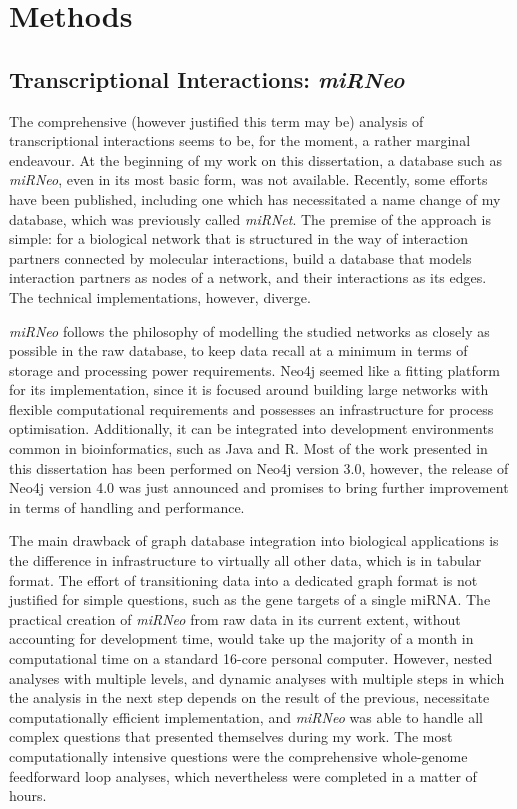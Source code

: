 \section{Methods} \label{sec:discussion:methods}

\subsection{Transcriptional Interactions: \emph{miRNeo}} \label{sec:discussion:mirneo}
The comprehensive (however justified this term may be) analysis of transcriptional interactions seems to be, for the moment, a rather marginal endeavour. At the beginning of my work on this dissertation, a database such as \emph{miRNeo}, even in its most basic form, was not available. Recently, some efforts have been published,\cite{Fan2016,Tokar2018} including one which has necessitated a name change of my database, which was previously called \emph{miRNet}.\cite{Fan2016} The premise of the approach is simple: for a biological network that is structured in the way of interaction partners connected by molecular interactions, build a database that models interaction partners as nodes of a network, and their interactions as its edges. The technical implementations, however, diverge.

\emph{miRNeo} follows the philosophy of modelling the studied networks as closely as possible in the raw database, to keep data recall at a minimum in terms of storage and processing power requirements. Neo4j seemed like a fitting platform for its implementation, since it is focused around building large networks with flexible computational requirements and possesses an infrastructure for process optimisation. Additionally, it can be integrated into development environments common in bioinformatics, such as Java and R. Most of the work presented in this dissertation has been performed on Neo4j version 3.0, however, the release of Neo4j version 4.0 was just announced and promises to bring further improvement in terms of handling and performance.\cite{Neo4j2020}

The main drawback of graph database integration into biological applications is the difference in infrastructure to virtually all other data, which is in tabular format. The effort of transitioning data into a dedicated graph format is not justified for simple questions, such as the gene targets of a single miRNA. The practical creation of \emph{miRNeo} from raw data in its current extent, without accounting for development time, would take up the majority of a month in computational time on a standard 16-core personal computer. However, nested analyses with multiple levels, and dynamic analyses with multiple steps in which the analysis in the next step depends on the result of the previous, necessitate computationally efficient implementation, and \emph{miRNeo} was able to handle all complex questions that presented themselves during my work. The most computationally intensive questions were the comprehensive whole-genome feedforward loop analyses, which nevertheless were completed in a matter of hours.

